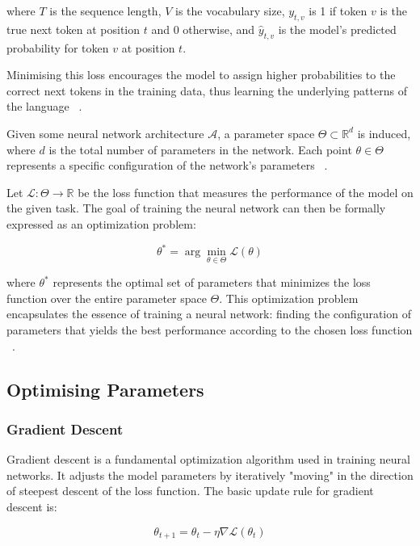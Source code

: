 \documentclass[a4paper, oneside]{discothesis}
\begin{document}
where $T$ is the sequence length, $V$ is the vocabulary size, $y_{t,v}$ is 1 if token $v$ is the true next token at position $t$ and 0 otherwise, and $\hat{y}_{t,v}$ is the model's predicted probability for token $v$ at position $t$.

Minimising this loss encourages the model to assign higher probabilities to the correct next tokens in the training data, thus learning the underlying patterns of the language ~\cite{bengio2003neural}.

Given some neural network architecture $\mathcal{A}$, a parameter space $\Theta \subset \mathbb{R}^d$ is induced, where $d$ is the total number of parameters in the network. Each point $\theta \in \Theta$ represents a specific configuration of the network's parameters ~\cite{lecun2015deep}.

Let $\mathcal{L}: \Theta \rightarrow \mathbb{R}$ be the loss function that measures the performance of the model on the given task. The goal of training the neural network can then be formally expressed as an optimization problem:

\begin{equation}
    \theta^* = \arg\min_{\theta \in \Theta} \mathcal{L}(\theta)
\end{equation}

where $\theta^*$ represents the optimal set of parameters that minimizes the loss function over the entire parameter space $\Theta$. This optimization problem encapsulates the essence of training a neural network: finding the configuration of parameters that yields the best performance according to the chosen loss function ~\cite{rumelhart1986learning}.


\subsection{Optimising Parameters}

\subsubsection{Gradient Descent}

Gradient descent is a fundamental optimization algorithm used in training neural networks. It adjusts the model parameters by iteratively "moving" in the direction of steepest descent of the loss function. The basic update rule for gradient descent is:

\begin{equation}
    \theta_{t+1} = \theta_t - \eta \nabla \mathcal{L}(\theta_t)
\end{equation}
\end{document}
